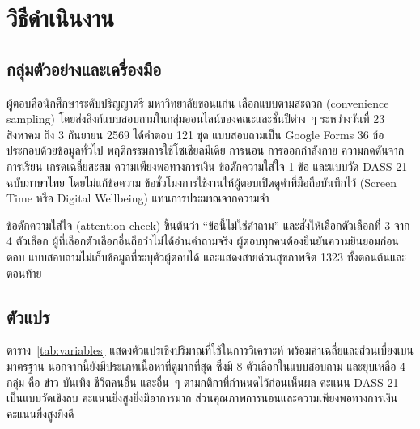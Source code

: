 \section{วิธีดำเนินงาน}

\subsection{กลุ่มตัวอย่างและเครื่องมือ}

ผู้ตอบคือนักศึกษาระดับปริญญาตรี มหาวิทยาลัยขอนแก่น เลือกแบบตามสะดวก (convenience sampling)
โดยส่งลิงก์แบบสอบถามในกลุ่มออนไลน์ของคณะและชั้นปีต่าง~ๆ
ระหว่างวันที่ 23 สิงหาคม ถึง 3 กันยายน 2569 ได้คำตอบ 121 ชุด
แบบสอบถามเป็น Google Forms 36 ข้อ ประกอบด้วยข้อมูลทั่วไป พฤติกรรมการใช้โซเชียลมีเดีย
การนอน การออกกำลังกาย ความกดดันจากการเรียน เกรดเฉลี่ยสะสม ความเพียงพอทางการเงิน
ข้อดักความใส่ใจ 1 ข้อ และแบบวัด DASS-21 ฉบับภาษาไทย \cite{webster2008thai} โดยไม่แก้ข้อความ
ข้อชั่วโมงการใช้งานให้ผู้ตอบเปิดดูค่าที่มือถือบันทึกไว้ (Screen Time หรือ Digital Wellbeing)
แทนการประมาณจากความจำ

ข้อดักความใส่ใจ (attention check) ขึ้นต้นว่า ``ข้อนี้ไม่ใช่คำถาม''
และสั่งให้เลือกตัวเลือกที่ 3 จาก 4 ตัวเลือก ผู้ที่เลือกตัวเลือกอื่นถือว่าไม่ได้อ่านคำถามจริง
ผู้ตอบทุกคนต้องยืนยันความยินยอมก่อนตอบ แบบสอบถามไม่เก็บข้อมูลที่ระบุตัวผู้ตอบได้
และแสดงสายด่วนสุขภาพจิต 1323 ทั้งตอนต้นและตอนท้าย

\subsection{ตัวแปร}

ตาราง~\ref{tab:variables} แสดงตัวแปรเชิงปริมาณที่ใช้ในการวิเคราะห์ พร้อมค่าเฉลี่ยและส่วนเบี่ยงเบนมาตรฐาน
นอกจากนี้ยังมีประเภทเนื้อหาที่ดูมากที่สุด ซึ่งมี 8 ตัวเลือกในแบบสอบถาม
และยุบเหลือ 4 กลุ่ม คือ ข่าว บันเทิง ชีวิตคนอื่น และอื่น~ๆ ตามกติกาที่กำหนดไว้ก่อนเห็นผล
คะแนน DASS-21 เป็นแบบวัดเชิงลบ คะแนนยิ่งสูงยิ่งมีอาการมาก
ส่วนคุณภาพการนอนและความเพียงพอทางการเงิน คะแนนยิ่งสูงยิ่งดี

